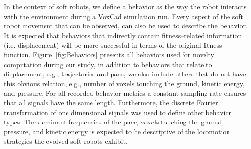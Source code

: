 \documentclass{sig-alternate}
\begin{document}

In the context of soft robots, we define a behavior as the way the robot interacts with the environment during a VoxCad simulation run. Every aspect of the soft robot movement that can be observed, can also be used to describe the behavior. 
It is expected that behaviors that indirectly contain fitness--related information (i.e. displacement) will be more successful in terms of the original fitness function. Figure~\ref{fig:Behaviors} presents all behaviors used for novelty computation during our study, in addition to behaviors that relate to displacement, e.g., trajectories and pace, we also include others that do not have this obvious relation, e.g., number of voxels touching the ground, kinetic energy, and pressure. For all recorded behavior metrics a constant sampling rate ensures that all signals have the same length. Furthermore, the discrete Fourier transformation of one dimensional signals was used to define other behavior types. The dominant frequencies of the pace, voxels touching the ground, pressure, and kinetic energy is expected to be descriptive of the locomotion strategies the evolved soft robots exhibit.
\end{document}
